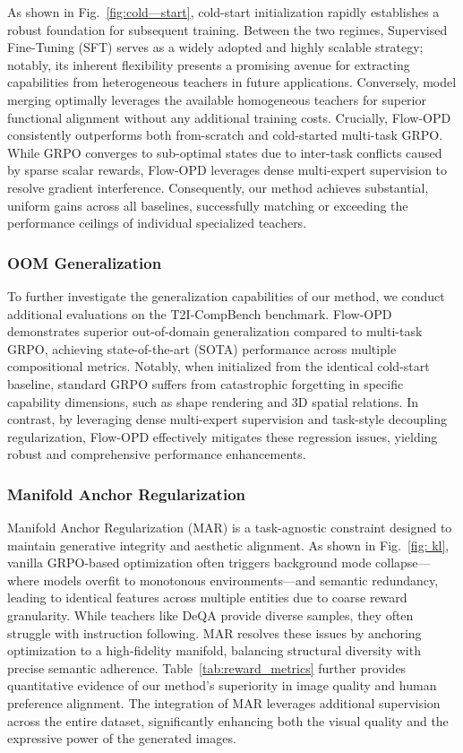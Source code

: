 



As shown in Fig.~\ref{fig:cold—start}, cold-start initialization rapidly establishes a robust foundation for subsequent training. Between the two regimes, Supervised Fine-Tuning (SFT) serves as a widely adopted and highly scalable strategy; notably, its inherent flexibility presents a promising avenue for extracting capabilities from heterogeneous teachers in future applications. Conversely, model merging optimally leverages the available homogeneous teachers for superior functional alignment without any additional training costs. 
%
Crucially, Flow-OPD consistently outperforms both from-scratch and cold-started multi-task GRPO. While GRPO converges to sub-optimal states due to inter-task conflicts caused by sparse scalar rewards, Flow-OPD leverages dense multi-expert supervision to resolve gradient interference. Consequently, our method achieves substantial, uniform gains across all baselines, successfully matching or exceeding the performance ceilings of individual specialized teachers.

\subsubsection{OOM Generalization}

To further investigate the generalization capabilities of our method, we conduct additional evaluations on the T2I-CompBench benchmark. Flow-OPD demonstrates superior out-of-domain generalization compared to multi-task GRPO, achieving state-of-the-art (SOTA) performance across multiple compositional metrics. Notably, when initialized from the identical cold-start baseline, standard GRPO suffers from catastrophic forgetting in specific capability dimensions, such as shape rendering and 3D spatial relations. In contrast, by leveraging dense multi-expert supervision and task-style decoupling regularization, Flow-OPD effectively mitigates these regression issues, yielding robust and comprehensive performance enhancements.

\subsubsection{Manifold Anchor Regularization}


Manifold Anchor Regularization (MAR) is a task-agnostic constraint designed to maintain generative integrity and aesthetic alignment. As shown in Fig.~\ref{fig: kl}, vanilla GRPO-based optimization often triggers background mode collapse—where models overfit to monotonous environments—and semantic redundancy, leading to identical features across multiple entities due to coarse reward granularity. While teachers like DeQA provide diverse samples, they often struggle with instruction following. MAR resolves these issues by anchoring optimization to a high-fidelity manifold, balancing structural diversity with precise semantic adherence.
Table~\ref{tab:reward_metrics} further provides quantitative evidence of our method's superiority in image quality and human preference alignment. The integration of MAR leverages additional supervision across the entire dataset, significantly enhancing both the visual quality and the expressive power of the generated images.